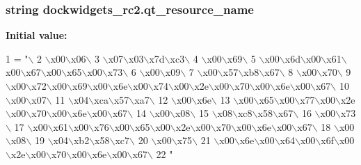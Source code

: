 \subsubsection[{qt\+\_\+resource\+\_\+name}]{\setlength{\rightskip}{0pt plus 5cm}string dockwidgets\+\_\+rc2.\+qt\+\_\+resource\+\_\+name}\label{namespacedockwidgets__rc2_a0045f04648f6f57b1c295bbac710ea39}
{\bfseries Initial value\+:}
\begin{DoxyCode}
1 = \textcolor{stringliteral}{"\(\backslash\)}
2 \textcolor{stringliteral}{\(\backslash\)x00\(\backslash\)x06\(\backslash\)}
3 \textcolor{stringliteral}{\(\backslash\)x07\(\backslash\)x03\(\backslash\)x7d\(\backslash\)xc3\(\backslash\)}
4 \textcolor{stringliteral}{\(\backslash\)x00\(\backslash\)x69\(\backslash\)}
5 \textcolor{stringliteral}{\(\backslash\)x00\(\backslash\)x6d\(\backslash\)x00\(\backslash\)x61\(\backslash\)x00\(\backslash\)x67\(\backslash\)x00\(\backslash\)x65\(\backslash\)x00\(\backslash\)x73\(\backslash\)}
6 \textcolor{stringliteral}{\(\backslash\)x00\(\backslash\)x09\(\backslash\)}
7 \textcolor{stringliteral}{\(\backslash\)x00\(\backslash\)x57\(\backslash\)xb8\(\backslash\)x67\(\backslash\)}
8 \textcolor{stringliteral}{\(\backslash\)x00\(\backslash\)x70\(\backslash\)}
9 \textcolor{stringliteral}{\(\backslash\)x00\(\backslash\)x72\(\backslash\)x00\(\backslash\)x69\(\backslash\)x00\(\backslash\)x6e\(\backslash\)x00\(\backslash\)x74\(\backslash\)x00\(\backslash\)x2e\(\backslash\)x00\(\backslash\)x70\(\backslash\)x00\(\backslash\)x6e\(\backslash\)x00\(\backslash\)x67\(\backslash\)}
10 \textcolor{stringliteral}{\(\backslash\)x00\(\backslash\)x07\(\backslash\)}
11 \textcolor{stringliteral}{\(\backslash\)x04\(\backslash\)xca\(\backslash\)x57\(\backslash\)xa7\(\backslash\)}
12 \textcolor{stringliteral}{\(\backslash\)x00\(\backslash\)x6e\(\backslash\)}
13 \textcolor{stringliteral}{\(\backslash\)x00\(\backslash\)x65\(\backslash\)x00\(\backslash\)x77\(\backslash\)x00\(\backslash\)x2e\(\backslash\)x00\(\backslash\)x70\(\backslash\)x00\(\backslash\)x6e\(\backslash\)x00\(\backslash\)x67\(\backslash\)}
14 \textcolor{stringliteral}{\(\backslash\)x00\(\backslash\)x08\(\backslash\)}
15 \textcolor{stringliteral}{\(\backslash\)x08\(\backslash\)xc8\(\backslash\)x58\(\backslash\)x67\(\backslash\)}
16 \textcolor{stringliteral}{\(\backslash\)x00\(\backslash\)x73\(\backslash\)}
17 \textcolor{stringliteral}{\(\backslash\)x00\(\backslash\)x61\(\backslash\)x00\(\backslash\)x76\(\backslash\)x00\(\backslash\)x65\(\backslash\)x00\(\backslash\)x2e\(\backslash\)x00\(\backslash\)x70\(\backslash\)x00\(\backslash\)x6e\(\backslash\)x00\(\backslash\)x67\(\backslash\)}
18 \textcolor{stringliteral}{\(\backslash\)x00\(\backslash\)x08\(\backslash\)}
19 \textcolor{stringliteral}{\(\backslash\)x04\(\backslash\)xb2\(\backslash\)x58\(\backslash\)xc7\(\backslash\)}
20 \textcolor{stringliteral}{\(\backslash\)x00\(\backslash\)x75\(\backslash\)}
21 \textcolor{stringliteral}{\(\backslash\)x00\(\backslash\)x6e\(\backslash\)x00\(\backslash\)x64\(\backslash\)x00\(\backslash\)x6f\(\backslash\)x00\(\backslash\)x2e\(\backslash\)x00\(\backslash\)x70\(\backslash\)x00\(\backslash\)x6e\(\backslash\)x00\(\backslash\)x67\(\backslash\)}
22 \textcolor{stringliteral}{"}
\end{DoxyCode}
